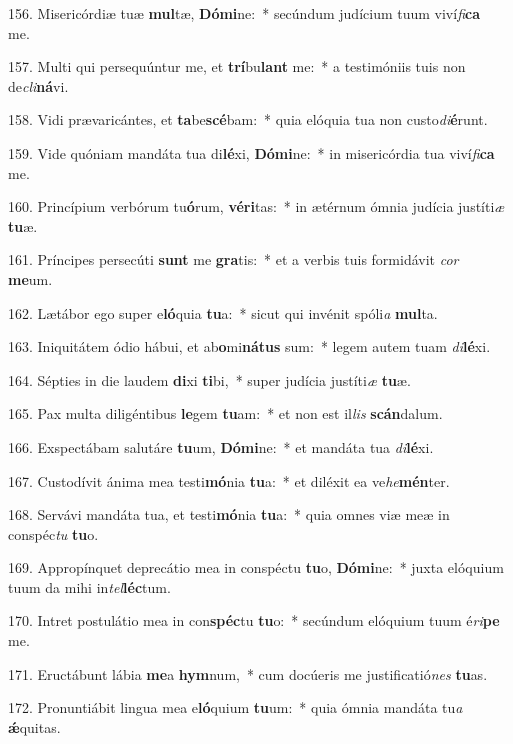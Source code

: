 156. Misericórdiæ tuæ \textbf{mul}tæ, \textbf{Dó}\textbf{mi}ne:~*  secúndum judícium tuum viví\textit{fi}\textbf{ca} me.\

157. Multi qui persequúntur me, et \textbf{trí}bu\textbf{lant} me:~*  a testimóniis tuis non de\textit{cli}\textbf{ná}vi.\

158. Vidi prævaricántes, et \textbf{ta}be\textbf{scé}bam:~*  quia elóquia tua non custo\textit{di}\textbf{é}runt.\

159. Vide quóniam mandáta tua di\textbf{lé}xi, \textbf{Dó}\textbf{mi}ne:~*  in misericórdia tua viví\textit{fi}\textbf{ca} me.\

160. Princípium verbórum tu\textbf{ó}rum, \textbf{vé}\textbf{ri}tas:~*  in ætérnum ómnia judícia justíti\textit{æ} \textbf{tu}æ.\

161. Príncipes persecúti \textbf{sunt} me \textbf{gra}tis:~*  et a verbis tuis formidávit \textit{cor} \textbf{me}um.\

162. Lætábor ego super e\textbf{ló}quia \textbf{tu}a:~*  sicut qui invénit spóli\textit{a} \textbf{mul}ta.\

163. Iniquitátem ódio hábui, et ab\textbf{o}mi\textbf{ná}\textbf{tus} sum:~*  legem autem tuam \textit{di}\textbf{lé}xi.\

164. Sépties in die laudem \textbf{di}xi \textbf{ti}bi,~*  super judícia justíti\textit{æ} \textbf{tu}æ.\

165. Pax multa diligéntibus \textbf{le}gem \textbf{tu}am:~*  et non est il\textit{lis} \textbf{scán}dalum.\

166. Exspectábam salutáre \textbf{tu}um, \textbf{Dó}\textbf{mi}ne:~*  et mandáta tua \textit{di}\textbf{lé}xi.\

167. Custodívit ánima mea testi\textbf{mó}nia \textbf{tu}a:~*  et diléxit ea ve\textit{he}\textbf{mén}ter.\

168. Servávi mandáta tua, et testi\textbf{mó}nia \textbf{tu}a:~*  quia omnes viæ meæ in conspéc\textit{tu} \textbf{tu}o.\

169. Appropínquet deprecátio mea in conspéctu \textbf{tu}o, \textbf{Dó}\textbf{mi}ne:~*  juxta elóquium tuum da mihi in\textit{tel}\textbf{léc}tum.\

170. Intret postulátio mea in con\textbf{spéc}tu \textbf{tu}o:~*  secúndum elóquium tuum é\textit{ri}\textbf{pe} me.\

171. Eructábunt lábia \textbf{me}a \textbf{hym}num,~*  cum docúeris me justificatió\textit{nes} \textbf{tu}as.\

172. Pronuntiábit lingua mea e\textbf{ló}quium \textbf{tu}um:~*  quia ómnia mandáta tu\textit{a} \textbf{ǽ}quitas.\

